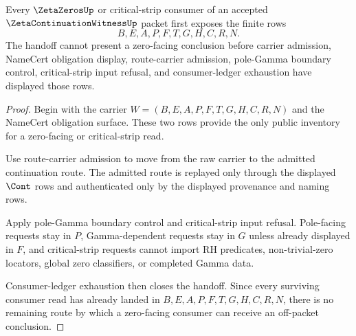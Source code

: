 \begin{theorem}
\label{thm:zeta-continuation-witness-zero-consumer-handoff}
Every $\ZetaZerosUp$ or critical-strip consumer of an accepted $\ZetaContinuationWitnessUp$ packet first exposes the finite rows
$$
B,E,A,P,F,T,G,H,C,R,N.
$$
The handoff cannot present a zero-facing conclusion before carrier admission, NameCert obligation display, route-carrier admission, pole-Gamma boundary control, critical-strip input refusal, and consumer-ledger exhaustion have displayed those rows.
\end{theorem}
\begin{proof}
Begin with the carrier $W=(B,E,A,P,F,T,G,H,C,R,N)$ and the NameCert obligation surface. These two rows provide the only public inventory for a zero-facing or critical-strip read.

Use route-carrier admission to move from the raw carrier to the admitted continuation route. The admitted route is replayed only through the displayed $\Cont$ rows and authenticated only by the displayed provenance and naming rows.

Apply pole-Gamma boundary control and critical-strip input refusal. Pole-facing requests stay in $P$, Gamma-dependent requests stay in $G$ unless already displayed in $F$, and critical-strip requests cannot import RH predicates, non-trivial-zero locators, global zero classifiers, or completed Gamma data.

Consumer-ledger exhaustion then closes the handoff. Since every surviving consumer read has already landed in $B,E,A,P,F,T,G,H,C,R,N$, there is no remaining route by which a zero-facing consumer can receive an off-packet conclusion.
\end{proof}

